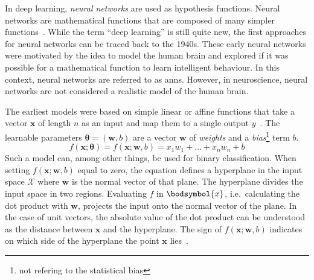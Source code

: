 In deep learning, \textit{neural networks} are used as hypothesis functions.
Neural networks are mathematical functions that are composed of many simpler functions~\autocite{Goodfellow-et-al-2016}.
While the term \enquote{deep learning} is still quite new, the first approaches for neural networks can be traced back to the 1940s.
These early neural networks were motivated by the idea to model the human brain and explored if it was possible for a mathematical function to learn intelligent behaviour.
In this context, neural networks are referred to as \glspl{ann}.
However, in neuroscience, neural networks are not considered a realistic model of the human brain.

The earliest models were based on simple linear or affine functions that take a vector $\boldsymbol{x}$ of length $n$ as an input and map them to a single output $y$~\autocite{Goodfellow-et-al-2016}.
The learnable parameters $\boldsymbol{\theta} = (\boldsymbol{w}, b)$ are a vector $\boldsymbol{w}$ of \textit{weights} and a \textit{bias}\footnote{not refering to the statistical bias} term $b$.
\[
          f(\boldsymbol{x}; \boldsymbol{\theta}) = f(\boldsymbol{x}; \boldsymbol{w}, b) = x_1 w_1 + \dots + x_n w_n + b
\]
Such a model can, among other things, be used for binary classification.
When setting $f(\boldsymbol{x}; \boldsymbol{w}, b)$ equal to zero, the equation defines a hyperplane in the input space $\mathcal{X}$ where $\boldsymbol{w}$ is the normal vector of that plane.
The hyperplane divides the input space in two regions.
Evaluating $f$ in $\bodsymbol{x}$, i.e.\ calculating the dot product with $\boldsymbol{w}$, projects the input onto the normal vector of the plane.
In the case of unit vectors, the absolute value of the dot product can be understood as the distance between $\boldsymbol{x}$ and the hyperplane.
The sign of $f(\boldsymbol{x}; \boldsymbol{w}, b)$ indicates on which side of the hyperplane the point $\boldsymbol{x}$ lies~\autocite{bishop2006}.












